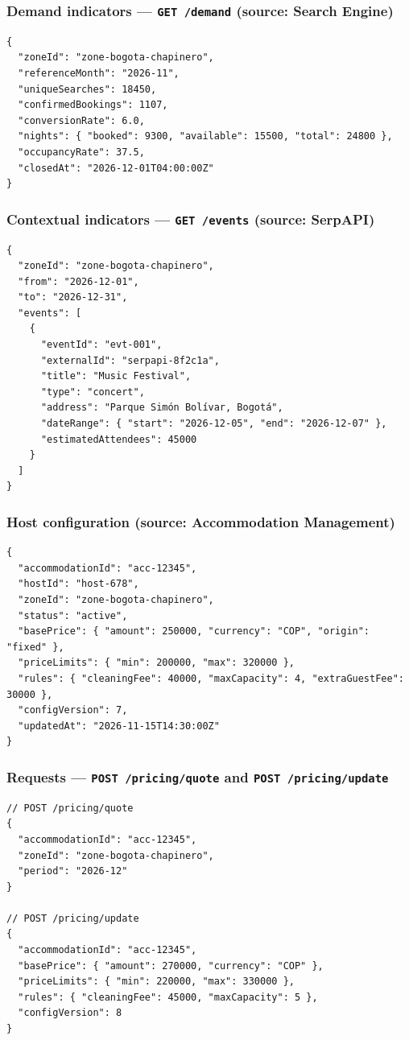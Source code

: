 \documentclass[11pt,a4paper]{article}
\begin{document}
\subsubsection{Demand indicators --- \texttt{GET /demand} (source: Search Engine)}
\begin{lstlisting}
{
  "zoneId": "zone-bogota-chapinero",
  "referenceMonth": "2026-11",
  "uniqueSearches": 18450,
  "confirmedBookings": 1107,
  "conversionRate": 6.0,
  "nights": { "booked": 9300, "available": 15500, "total": 24800 },
  "occupancyRate": 37.5,
  "closedAt": "2026-12-01T04:00:00Z"
}
\end{lstlisting}

\subsubsection{Contextual indicators --- \texttt{GET /events} (source: SerpAPI)}
\begin{lstlisting}
{
  "zoneId": "zone-bogota-chapinero",
  "from": "2026-12-01",
  "to": "2026-12-31",
  "events": [
    {
      "eventId": "evt-001",
      "externalId": "serpapi-8f2c1a",
      "title": "Music Festival",
      "type": "concert",
      "address": "Parque Simón Bolívar, Bogotá",
      "dateRange": { "start": "2026-12-05", "end": "2026-12-07" },
      "estimatedAttendees": 45000
    }
  ]
}
\end{lstlisting}

\subsubsection{Host configuration (source: Accommodation Management)}
\begin{lstlisting}
{
  "accommodationId": "acc-12345",
  "hostId": "host-678",
  "zoneId": "zone-bogota-chapinero",
  "status": "active",
  "basePrice": { "amount": 250000, "currency": "COP", "origin": "fixed" },
  "priceLimits": { "min": 200000, "max": 320000 },
  "rules": { "cleaningFee": 40000, "maxCapacity": 4, "extraGuestFee": 30000 },
  "configVersion": 7,
  "updatedAt": "2026-11-15T14:30:00Z"
}
\end{lstlisting}

\subsubsection{Requests --- \texttt{POST /pricing/quote} and \texttt{POST /pricing/update}}
\begin{lstlisting}
// POST /pricing/quote
{
  "accommodationId": "acc-12345",
  "zoneId": "zone-bogota-chapinero",
  "period": "2026-12"
}

// POST /pricing/update
{
  "accommodationId": "acc-12345",
  "basePrice": { "amount": 270000, "currency": "COP" },
  "priceLimits": { "min": 220000, "max": 330000 },
  "rules": { "cleaningFee": 45000, "maxCapacity": 5 },
  "configVersion": 8
}
\end{lstlisting}
\end{document}
